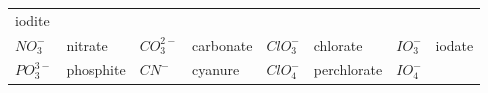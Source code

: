 \documentclass[
  11pt,
  french,
  a4paper,
  openany]{book}
\begin{document}
\begin{longtable}[]{@{}llllllll@{}}
\begin{minipage}[t]{0.09\columnwidth}
iodite\strut
\end{minipage}\tabularnewline
\begin{minipage}[t]{0.11\columnwidth}\raggedright
\(NO_3^{-}\)\strut
\end{minipage} & \begin{minipage}[t]{0.09\columnwidth}\raggedright
nitrate\strut
\end{minipage} & \begin{minipage}[t]{0.12\columnwidth}\raggedright
\(CO_3^{2-}\)\strut
\end{minipage} & \begin{minipage}[t]{0.09\columnwidth}\raggedright
carbonate\strut
\end{minipage} & \begin{minipage}[t]{0.09\columnwidth}\raggedright
\(ClO_3^{-}\)\strut
\end{minipage} & \begin{minipage}[t]{0.10\columnwidth}\raggedright
chlorate\strut
\end{minipage} & \begin{minipage}[t]{0.09\columnwidth}\raggedright
\(IO_3^{-}\)\strut
\end{minipage} & \begin{minipage}[t]{0.09\columnwidth}\raggedright
iodate\strut
\end{minipage}\tabularnewline
\begin{minipage}[t]{0.11\columnwidth}\raggedright
\(PO_3^{3-}\)\strut
\end{minipage} & \begin{minipage}[t]{0.09\columnwidth}\raggedright
phosphite\strut
\end{minipage} & \begin{minipage}[t]{0.12\columnwidth}\raggedright
\(CN^{-}\)\strut
\end{minipage} & \begin{minipage}[t]{0.09\columnwidth}\raggedright
cyanure\strut
\end{minipage} & \begin{minipage}[t]{0.09\columnwidth}\raggedright
\(ClO_4^{-}\)\strut
\end{minipage} & \begin{minipage}[t]{0.10\columnwidth}\raggedright
perchlorate\strut
\end{minipage} & \begin{minipage}[t]{0.09\columnwidth}\raggedright
\(IO_4^{-}\)\strut
\end{minipage} & \begin{minipage}[t]{0.09\columnwidth}\raggedright

\end{minipage}
\end{longtable}
\end{document}
